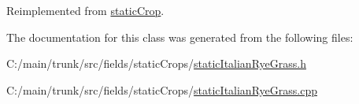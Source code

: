 Reimplemented from \hyperlink{classstatic_crop_af19d8a1e4f4833325f6712c22ede8b45}{staticCrop}.

The documentation for this class was generated from the following files:\begin{DoxyCompactItemize}
\item 
C:/main/trunk/src/fields/staticCrops/\hyperlink{static_italian_rye_grass_8h}{staticItalianRyeGrass.h}\item 
C:/main/trunk/src/fields/staticCrops/\hyperlink{static_italian_rye_grass_8cpp}{staticItalianRyeGrass.cpp}\end{DoxyCompactItemize}
